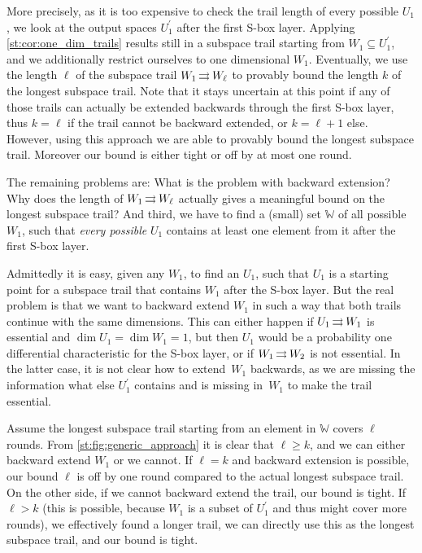 More precisely, as it is too expensive to check the trail length of every possible $U_1$, we look at the output spaces $U_1^\prime$ after the first S-box layer.
Applying \cref{st:cor:one_dim_trails} results still in a subspace trail starting from $W_1 \subseteq U_1^\prime$, and we additionally restrict ourselves to one dimensional $W_1$.
Eventually, we use the length $\ell$ of the subspace trail $W_1 \operatorname*{\rightrightarrows}^{}_{} W_\ell$ to provably bound the length $k$ of the longest subspace trail.
Note that it stays uncertain at this point if any of those trails can actually be extended backwards through the first S-box layer, thus $k = \ell$ if the trail cannot be backward extended, or $k = \ell+1$ else.
However, using this approach we are able to provably bound the longest subspace trail.
Moreover our bound is either tight or off by at most one round.

The remaining problems are:
What is the problem with backward extension?
Why does the length of $W_1 \operatorname*{\rightrightarrows}^{}_{} W_\ell$ actually gives a meaningful bound on the longest subspace trail?
And third, we have to find a (small) set $\mathbb{W}$ of all possible $W_1$, such that \emph{every possible} $U_1$ contains at least one element from it after the first S-box layer.

Admittedly it is easy, given any $W_1$, to find an $U_1$, such that $U_1$ is a starting point for a subspace trail that contains $W_1$ after the S-box layer.
But the real problem is that we want to backward extend $W_1$ in such a way that both trails continue with the same dimensions.
This can either happen if $U_1 \operatorname*{\rightrightarrows}^{}_{} W_1$ is essential and $\dim U_1 = \dim W_1 = 1$, but then $U_1$ would be a probability one differential characteristic for the S-box layer, or if $W_1 \operatorname*{\rightrightarrows}^{}_{} W_2$ is not essential.
In the latter case, it is not clear how to extend~$W_1$ backwards, as we are missing the information what else $U_1^\prime$ contains and is missing in~$W_1$ to make the trail essential.

Assume the longest subspace trail starting from an element in $\mathbb{W}$ covers $\ell$ rounds.
From \cref{st:fig:generic_approach} it is clear that $\ell \geqslant k$, and we can either backward extend $W_1$ or we cannot.
If $\ell = k$ and backward extension is possible, our bound $\ell$ is off by one round compared to the actual longest subspace trail.
On the other side, if we cannot backward extend the trail, our bound is tight.
If $\ell > k$ (this is possible, because $W_1$ is a subset of $U_1^\prime$ and thus might cover more rounds), we effectively found a longer trail, we can directly use this as the longest subspace trail, and our bound is tight.

